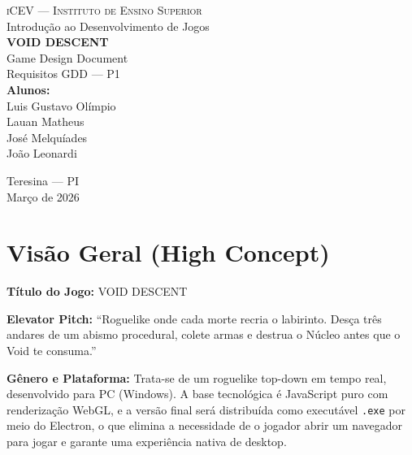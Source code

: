\documentclass[12pt, a4paper]{article}
\begin{document}
\begin{titlepage}
  \centering
  \vspace*{1cm}

  {\large\textsc{iCEV --- Instituto de Ensino Superior}}\\[0.3cm]
  {\normalsize Introdu\c{c}\~ao ao Desenvolvimento de Jogos}\\[3cm]

  {\Huge\bfseries\color{sec} VOID DESCENT}\\[0.5cm]
  {\Large\color{accent} Game Design Document}\\[0.3cm]
  {\normalsize Requisitos GDD --- P1}\\[4cm]

  {\large
    \textbf{Alunos:}\\[0.2cm]
    Luis Gustavo Ol\'impio\\
    Lauan Matheus\\
    Jos\'e Melqu\'iades\\
    Jo\~ao Leonardi\\[0.3cm]
  }

  \vfill

  {\normalsize Teresina --- PI}\\[0.2cm]
  {\normalsize Mar\c{c}o de 2026}
\end{titlepage}

\tableofcontents
\newpage

\section{Vis\~ao Geral (High Concept)}

\textbf{T\'itulo do Jogo:} VOID DESCENT

\textbf{Elevator Pitch:} ``Roguelike onde cada morte recria o labirinto. Des\c{c}a tr\^es andares de um abismo procedural, colete armas e destrua o N\'ucleo antes que o Void te consuma.''

\textbf{G\^enero e Plataforma:} Trata-se de um roguelike top-down em tempo real, desenvolvido para PC (Windows). A base tecnol\'ogica \'e JavaScript puro com renderiza\c{c}\~ao WebGL, e a vers\~ao final ser\'a distribu\'ida como execut\'avel \texttt{.exe} por meio do Electron, o que elimina a necessidade de o jogador abrir um navegador para jogar e garante uma experi\^encia nativa de desktop.
\end{document}
